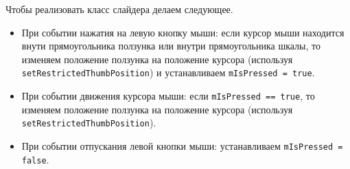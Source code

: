 \documentclass{article}
\begin{document}
Чтобы реализовать класс слайдера делаем следующее.
\begin{itemize}
\item При событии нажатия на левую кнопку мыши:
если курсор мыши находится внути прямоугольника ползунка или внутри прямоугольника шкалы, то изменяем положение ползунка на положение курсора (используя \texttt{setRestrictedThumbPosition}) и устанавливаем \texttt{mIsPressed = true}.
\item При событии движения курсора мыши: если \texttt{mIsPressed == true}, то изменяем положение ползунка на положение курсора (используя \texttt{setRestrictedThumbPosition}).
\item При событии отпускания левой кнопки мыши: устанавливаем \texttt{mIsPressed = false}.
\end{itemize}

\end{document}
